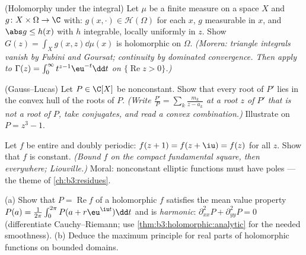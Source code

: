\begin{exercise}[$\star\star$]\label{exo:b3:holomorphic:7}
(Holomorphy under the integral) Let $\mu$ be a finite measure
on a space $X$ and $g \colon X\times\Omega \to \C$ with:
$g(x, \cdot) \in \mathcal H(\Omega)$ for each $x$, $g$
measurable in $x$, and $\abs g \leq h(x)$ with $h$ integrable,
locally uniformly in $z$. Show $G(z) = \int_Xg(x, z)\dd\mu(x)$
is holomorphic on $\Omega$. \emph{(Morera: triangle integrals
vanish by Fubini and Goursat; continuity by dominated
convergence. Then apply to $\Gamma(z) =
\int_0^\infty t^{z-1}\eu^{-t}\dd t$ on $\{\operatorname{Re}z >
0\}$.)}
\end{exercise}

\begin{exercise}[$\star\star\star$]\label{exo:b3:holomorphic:8}
(Gauss--Lucas) Let $P \in \C[X]$ be nonconstant. Show that
every root of $P'$ lies in the convex hull of the roots of
$P$. \emph{(Write $\frac{P'}{P} = \sum_k\frac{m_k}{z - a_k}$
at a root $z$ of $P'$ that is not a root of $P$, take
conjugates, and read a convex combination.)} Illustrate on
$P = z^3 - 1$.
\end{exercise}

\begin{exercise}[$\star\star\star$]\label{exo:b3:holomorphic:9}
Let $f$ be entire and doubly periodic: $f(z + 1) = f(z + \iu)
= f(z)$ for all $z$. Show that $f$ is constant. \emph{(Bound
$f$ on the compact fundamental square, then everywhere;
Liouville.)} Moral: nonconstant elliptic functions must have
poles --- the theme of \cref{ch:b3:residues}.
\end{exercise}

\begin{exercise}[$\star\star$]\label{exo:b3:holomorphic:10}
(a) Show that $P = \operatorname{Re}f$ of a holomorphic $f$
satisfies the mean value property $P(a) =
\frac1{2\pi}\int_0^{2\pi}P(a + r\eu^{\iu t})\dd t$ and is
\emph{harmonic}: $\partial^2_{xx}P + \partial^2_{yy}P = 0$
(differentiate Cauchy--Riemann; use
\cref{thm:b3:holomorphic:analytic} for the needed smoothness).
(b) Deduce the maximum principle for real parts of holomorphic
functions on bounded domains.
\end{exercise}

